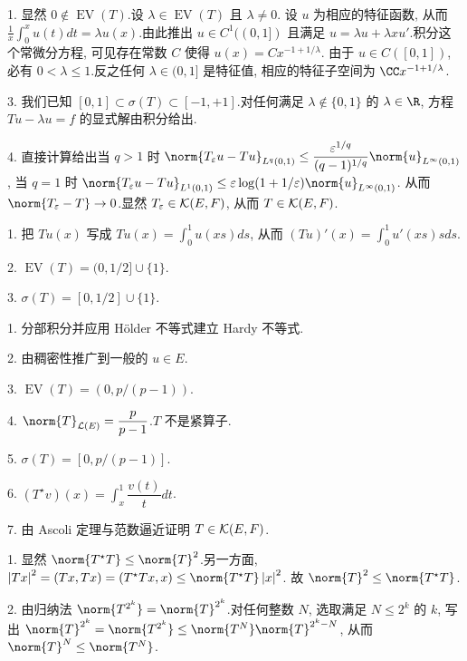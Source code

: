 
1. 显然 $0\notin\operatorname{EV}(T)$.设 $\lambda\in\operatorname{EV}(T)$ 且 $\lambda\ne0$.
设 $u$ 为相应的特征函数, 从而 $\frac1x\int_0^xu(t)dt=\lambda u(x)$.由此推出 $u\in C^1((0,1])$
且满足 $u=\lambda u+\lambda xu'$.积分这个常微分方程, 可见存在常数 $C$ 使得 $u(x)=Cx^{-1+1/\lambda}$.
由于 $u\in C([0,1])$, 必有 $0<\lambda\le1$.反之任何 $\lambda\in(0,1]$ 是特征值, 相应的特征子空间为
$\CC x^{-1+1/\lambda}$.

3. 我们已知 $[0,1]\subset\sigma(T)\subset[-1,+1]$.对任何满足 $\lambda\notin\{0,1\}$ 的
$\lambda\in\R$, 方程 $Tu-\lambda u=f$ 的显式解由积分给出.

4. 直接计算给出当 $q>1$ 时 $\norm{T_\varepsilon u-Tu}_{L^q(0,1)}\le\dfrac{\varepsilon^{1/q}}{(q-1)^{1/q}}\norm{u}_{L^\infty(0,1)}$,
当 $q=1$ 时 $\norm{T_\varepsilon u-Tu}_{L^1(0,1)}\le\varepsilon\log(1+1/\varepsilon)\norm{u}_{L^\infty(0,1)}$.
从而 $\norm{T_\varepsilon-T}\to0$.显然 $T_\varepsilon\in\mathcal{K}(E,F)$, 从而 $T\in\mathcal{K}(E,F)$.


1. 把 $Tu(x)$ 写成 $Tu(x)=\int_0^1u(xs)ds$, 从而 $(Tu)'(x)=\int_0^1u'(xs)sds$.

2. $\operatorname{EV}(T)=(0,1/2]\cup\{1\}$.

3. $\sigma(T)=[0,1/2]\cup\{1\}$.


1. 分部积分并应用 Hölder 不等式建立 Hardy 不等式.

2. 由稠密性推广到一般的 $u\in E$.

3. $\operatorname{EV}(T)=(0,p/(p-1))$.

4. $\norm{T}_{\LL(E)}=\dfrac{p}{p-1}$.$T$ 不是紧算子.

5. $\sigma(T)=[0,p/(p-1)]$.

6. $(T^\star v)(x)=\int_x^1\dfrac{v(t)}{t}dt$.

7. 由 Ascoli 定理与范数逼近证明 $T\in\mathcal{K}(E,F)$.



1. 显然 $\norm{T^\star T}\le\norm{T}^2$.另一方面, $\abs{Tx}^2=(Tx,Tx)=(T^\star Tx,x)\le\norm{T^\star T}\abs{x}^2$.
故 $\norm{T}^2\le\norm{T^\star T}$.

2. 由归纳法 $\norm{T^{2^k}}=\norm{T}^{2^k}$.对任何整数 $N$, 选取满足 $N\le2^k$ 的 $k$,
写出 $\norm{T}^{2^k}=\norm{T^{2^k}}\le\norm{T^N}\norm{T}^{2^k-N}$, 从而 $\norm{T}^N\le\norm{T^N}$.


